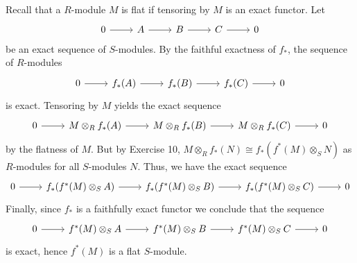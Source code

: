 \documentclass[../../master.tex]{subfiles}
\begin{document}
\begin{solution}
    Recall that a $R$-module $M$ is flat if tensoring by $M$ is an exact functor.
    Let
    \[
        \begin{tikzcd}
            0 & A & B & C & 0
            \arrow[from=1-1, to=1-2] 
            \arrow[from=1-2, to=1-3] 
            \arrow[from=1-3, to=1-4] 
            \arrow[from=1-4, to=1-5] 
        \end{tikzcd}
    \]
    be an exact sequence of $S$-modules.
    By the faithful exactness of $f_{*}$, the sequence of $R$-modules
    \[
        \begin{tikzcd}
            0 & f_{*}(A) & f_{*}(B) & f_{*}(C) & 0
            \arrow[from=1-1, to=1-2] 
            \arrow[from=1-2, to=1-3] 
            \arrow[from=1-3, to=1-4] 
            \arrow[from=1-4, to=1-5] 
        \end{tikzcd}
    \]
    is exact.
    Tensoring by $M$ yields the exact sequence
    \[
        \begin{tikzcd}
            0 & M \otimes_R f_{*}(A) & M \otimes_R f_{*}(B) & M \otimes_R f_{*}(C) & 0
            \arrow[from=1-1, to=1-2] 
            \arrow[from=1-2, to=1-3] 
            \arrow[from=1-3, to=1-4] 
            \arrow[from=1-4, to=1-5] 
        \end{tikzcd}
    \]
    by the flatness of $M$.
    But by Exercise 10, $M \otimes_R f_{*}(N) \cong f_{*}(f^{*}(M) \otimes_S N)$ as $R$-modules for all $S$-modules $N$.
    Thus, we have the exact sequence
    \[
        \begin{tikzcd}
            0 & f_{*}(f^{*}(M) \otimes_S A) & f_{*}(f^{*}(M) \otimes_S B) & f_{*}(f^{*}(M) \otimes_S C) & 0
            \arrow[from=1-1, to=1-2] 
            \arrow[from=1-2, to=1-3] 
            \arrow[from=1-3, to=1-4] 
            \arrow[from=1-4, to=1-5] 
        \end{tikzcd}
    \]
    Finally, since $f_{*}$ is a faithfully exact functor we conclude that the sequence
    \[
        \begin{tikzcd}
            0 & f^{*}(M) \otimes_S A & f^{*}(M) \otimes_S B & f^{*}(M) \otimes_S C & 0
            \arrow[from=1-1, to=1-2] 
            \arrow[from=1-2, to=1-3] 
            \arrow[from=1-3, to=1-4] 
            \arrow[from=1-4, to=1-5] 
        \end{tikzcd}
    \]
    is exact, hence $f^{*}(M)$ is a flat $S$-module.
\end{solution}
\end{document}
